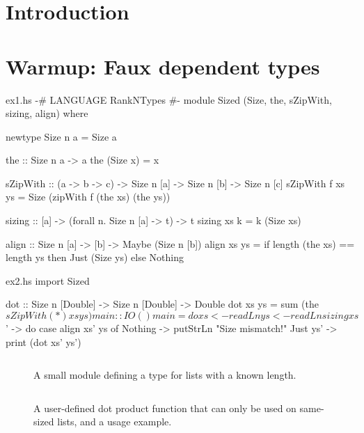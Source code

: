 \documentclass[format=sigplan, review=false, screen=true]{acmart}
\begin{document}
\renewcommand{\shortauthors}{M. Noonan}

%

\section{Introduction}

\section{Warmup: Faux dependent types}

\begin{filecontents*}{ex1.hs}  
{-# LANGUAGE RankNTypes #-}
module Sized
  (Size, the, sZipWith, sizing, align) where

newtype Size n a = Size a

the :: Size n a -> a
the (Size x) = x

sZipWith :: (a -> b -> c)
         -> Size n [a]
         -> Size n [b]
         -> Size n [c]
sZipWith f xs ys =
  Size (zipWith f (the xs) (the ys))
  
sizing :: [a] -> (forall n. Size n [a] -> t) -> t
sizing xs k = k (Size xs)

align :: Size n [a] -> [b] -> Maybe (Size n [b])
align xs ys = if length (the xs) == length ys
              then Just (Size ys)
              else Nothing

\end{filecontents*}

\begin{filecontents*}{ex2.hs}
import Sized

dot :: Size n [Double] -> Size n [Double] -> Double
dot xs ys = sum (the $ sZipWith (*) xs ys)

main :: IO ()
main = do
  xs <- readLn
  ys <- readLn
  sizing xs $ \xs' -> do
    case align xs' ys of
      Nothing  -> putStrLn "Size mismatch!"
      Just ys' -> print (dot xs' ys')
\end{filecontents*}

\begin{figure}
    \inputminted{haskell}{ex1.hs}
  \caption{A small module defining a type for lists with a known length.}
\end{figure}
\begin{figure}
    \inputminted{haskell}{ex2.hs}
    \caption{A user-defined dot product function that can only be used on same-sized lists,
    and a usage example.}
\end{figure}
\end{document}
